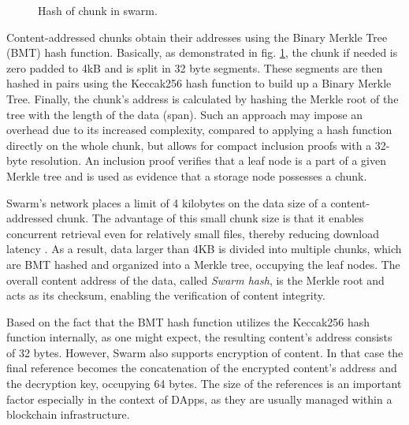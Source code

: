 \begin{figure}[htbp]
    \centering
    \resizebox{1\textwidth}{!}{
    }
    \caption{Hash of chunk in swarm. \citep{tron_2020}}
    \label{fig:bmt}
 \end{figure}

Content-addressed chunks obtain their addresses using the Binary Merkle Tree (BMT) hash function. Basically, as demonstrated in fig. \ref{fig:bmt}, the chunk if needed is zero padded to 4kB and is split in 32 byte segments. These segments are then hashed in pairs using the Keccak256 hash function to build up a Binary Merkle Tree. Finally, the chunk's address is calculated by hashing the Merkle root of the tree with the length of the data (span). Such an approach may impose an overhead due to its increased complexity, compared to applying a hash function directly on the whole chunk, but allows for compact inclusion proofs with a 32-byte resolution. An inclusion proof verifies that a leaf node is a part of a given Merkle tree \citep{merkle_1988} and is used as evidence that a storage node possesses a chunk.

Swarm's network places a limit of 4 kilobytes on the data size of a content-addressed chunk. The advantage of this small chunk size is that it enables concurrent retrieval even for relatively small files, thereby reducing download latency \citep[p.~38]{tron_2020}. As a result, data larger than 4KB is divided into multiple chunks, which are BMT hashed and organized into a Merkle tree, occupying the leaf nodes. The overall content address of the data, called \textit{Swarm hash}, is the Merkle root and acts as its checksum, enabling the verification of content integrity.

Based on the fact that the BMT hash function utilizes the Keccak256 hash function internally, as one might expect, the resulting content's address consists of 32 bytes. However, Swarm also supports encryption of content. In that case the final reference becomes the concatenation of the encrypted content's address and the decryption key, occupying 64 bytes. The size of the references is an important factor especially in the context of DApps, as they are usually managed within a blockchain infrastructure.

